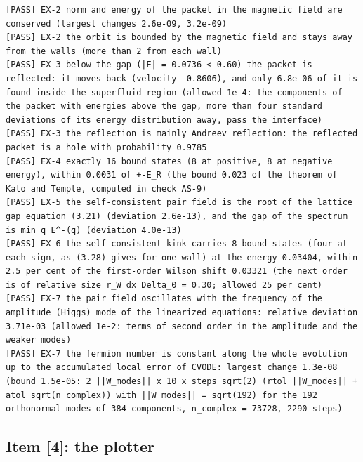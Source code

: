 \documentclass[
  10pt,
]{article}
\begin{document}
\begin{verbatim}
[PASS] EX-2 norm and energy of the packet in the magnetic field are conserved (largest changes 2.6e-09, 3.2e-09)
[PASS] EX-2 the orbit is bounded by the magnetic field and stays away from the walls (more than 2 from each wall)
[PASS] EX-3 below the gap (|E| = 0.0736 < 0.60) the packet is reflected: it moves back (velocity -0.8606), and only 6.8e-06 of it is found inside the superfluid region (allowed 1e-4: the components of the packet with energies above the gap, more than four standard deviations of its energy distribution away, pass the interface)
[PASS] EX-3 the reflection is mainly Andreev reflection: the reflected packet is a hole with probability 0.9785
[PASS] EX-4 exactly 16 bound states (8 at positive, 8 at negative energy), within 0.0031 of +-E_R (the bound 0.023 of the theorem of Kato and Temple, computed in check AS-9)
[PASS] EX-5 the self-consistent pair field is the root of the lattice gap equation (3.21) (deviation 2.6e-13), and the gap of the spectrum is min_q E^-(q) (deviation 4.0e-13)
[PASS] EX-6 the self-consistent kink carries 8 bound states (four at each sign, as (3.28) gives for one wall) at the energy 0.03404, within 2.5 per cent of the first-order Wilson shift 0.03321 (the next order is of relative size r_W dx Delta_0 = 0.30; allowed 25 per cent)
[PASS] EX-7 the pair field oscillates with the frequency of the amplitude (Higgs) mode of the linearized equations: relative deviation 3.71e-03 (allowed 1e-2: terms of second order in the amplitude and the weaker modes)
[PASS] EX-7 the fermion number is constant along the whole evolution up to the accumulated local error of CVODE: largest change 1.3e-08 (bound 1.5e-05: 2 ||W_modes|| x 10 x steps sqrt(2) (rtol ||W_modes|| + atol sqrt(n_complex)) with ||W_modes|| = sqrt(192) for the 192 orthonormal modes of 384 components, n_complex = 73728, 2290 steps)
\end{verbatim}

\hypertarget{item-4-the-plotter}{%
\subsection{Item {[}4{]}: the plotter}\label{item-4-the-plotter}}
\end{document}
